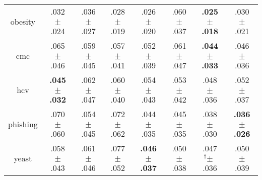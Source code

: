 \begin{tabular}{|c|ccccccc|}
obesity & .032$^{\phantom{\dag}}\pm^{\phantom{\dag}}$.024\cellcolor{green!23} & .036$^{\phantom{\dag}}\pm^{\phantom{\dag}}$.027\cellcolor{green!15} & .028$^{\phantom{\dag}}\pm^{\phantom{\dag}}$.019\cellcolor{green!32} & .026$^{\phantom{\dag}}\pm^{\phantom{\dag}}$.020\cellcolor{green!36} & .060$^{\phantom{\dag}}\pm^{\phantom{\dag}}$.037\cellcolor{red!40} & \textbf{.025$^{\phantom{\dag}}\pm^{\phantom{\dag}}$.018}\cellcolor{green!40} & .030$^{\phantom{\dag}}\pm^{\phantom{\dag}}$.021\cellcolor{green!28} \\
cmc & .065$^{\phantom{\dag}}\pm^{\phantom{\dag}}$.046\cellcolor{red!40} & .059$^{\phantom{\dag}}\pm^{\phantom{\dag}}$.045\cellcolor{red!17} & .057$^{\phantom{\dag}}\pm^{\phantom{\dag}}$.041\cellcolor{red!10} & .052$^{\phantom{\dag}}\pm^{\phantom{\dag}}$.039\cellcolor{green!9} & .061$^{\phantom{\dag}}\pm^{\phantom{\dag}}$.047\cellcolor{red!25} & \textbf{.044$^{\phantom{\dag}}\pm^{\phantom{\dag}}$.033}\cellcolor{green!40} & .046$^{\phantom{\dag}}\pm^{\phantom{\dag}}$.036\cellcolor{green!32} \\
hcv & \textbf{.045$^{\phantom{\dag}}\pm^{\phantom{\dag}}$.032}\cellcolor{green!40} & .062$^{\phantom{\dag}}\pm^{\phantom{\dag}}$.047\cellcolor{red!40} & .060$^{\phantom{\dag}}\pm^{\phantom{\dag}}$.040\cellcolor{red!27} & .054$^{\phantom{\dag}}\pm^{\phantom{\dag}}$.043\cellcolor{red!3} & .053$^{\phantom{\dag}}\pm^{\phantom{\dag}}$.042\cellcolor{green!1} & .048$^{\phantom{\dag}}\pm^{\phantom{\dag}}$.036\cellcolor{green!25} & .052$^{\phantom{\dag}}\pm^{\phantom{\dag}}$.037\cellcolor{green!8} \\
phishing & .070$^{\phantom{\dag}}\pm^{\phantom{\dag}}$.060\cellcolor{red!35} & .054$^{\phantom{\dag}}\pm^{\phantom{\dag}}$.045\cellcolor{green!0} & .072$^{\phantom{\dag}}\pm^{\phantom{\dag}}$.062\cellcolor{red!40} & .044$^{\phantom{\dag}}\pm^{\phantom{\dag}}$.035\cellcolor{green!21} & .045$^{\phantom{\dag}}\pm^{\phantom{\dag}}$.035\cellcolor{green!19} & .038$^{\phantom{\dag}}\pm^{\phantom{\dag}}$.030\cellcolor{green!33} & \textbf{.036$^{\phantom{\dag}}\pm^{\phantom{\dag}}$.026}\cellcolor{green!40} \\
yeast & .058$^{\phantom{\dag}}\pm^{\phantom{\dag}}$.043\cellcolor{green!9} & .061$^{\phantom{\dag}}\pm^{\phantom{\dag}}$.046\cellcolor{green!1} & .077$^{\phantom{\dag}}\pm^{\phantom{\dag}}$.052\cellcolor{red!40} & \textbf{.046$^{\phantom{\dag}}\pm^{\phantom{\dag}}$.037}\cellcolor{green!40} & .050$^{\phantom{\dag}}\pm^{\phantom{\dag}}$.038\cellcolor{green!31} & .047$^{\dag}\pm^{\phantom{\dag}}$.036\cellcolor{green!37} & .050$^{\phantom{\dag}}\pm^{\phantom{\dag}}$.039\cellcolor{green!30} \\

\end{tabular}
